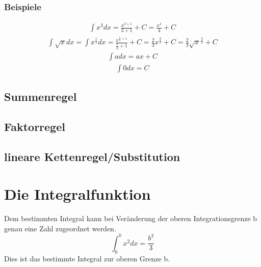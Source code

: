 \documentclass[12pt, a4paper]{report}
\begin{document}
\subsubsection{Beispiele}

\begin{fleqn}[\parindent]
\begin{equation}
\begin{split}
\int x^3 dx = \frac{x^{3+1}}{3+1}+C = \frac{x^{4}}{4}+C
\end{split}
\end{equation}
\begin{equation}
\begin{split}
\int \sqrt{x} dx = \int x^{\frac{1}{2}} dx = \frac{x^{\frac{1}{2}+1}}{\frac{1}{2}+1}+C=\frac{2}{3}x^{\frac{3}{2}}+C=\frac{2}{3}\sqrt{x}^{\frac{3}{2}}+C
\end{split}
\end{equation}
\begin{equation}
\begin{split}
\int adx = ax+C
\end{split}
\end{equation}
\begin{equation}
\begin{split}
\int 0dx = C
\end{split}
\end{equation}
\end{fleqn}

\subsection{Summenregel}
\subsection{Faktorregel}
\subsection{lineare Kettenregel/Substitution}

\section{Die Integralfunktion}
Dem bestimmten Integral kann bei Veränderung der oberen Integrationsgrenze b genau eine Zahl zugeordnet werden.
\begin{equation}
\int_0^b x^2 dx=\frac{b^3}{3}
\end{equation}
Dies ist das bestimmte Integral zur oberen Grenze b.
\end{document}

